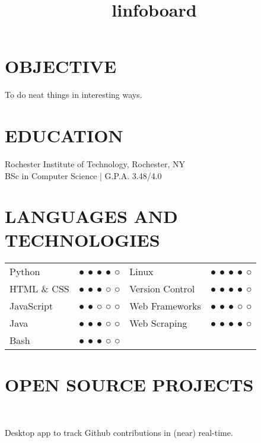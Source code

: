 \documentclass[line]{res}
\begin{document}

\address{131 Countess Drive\\West Henrietta, NY 14586}

\begin{resume}

\section{OBJECTIVE}
    To do neat things in interesting ways.

\section{EDUCATION}
    Rochester Institute of Technology, Rochester, NY \\
    BSc in Computer Science | G.P.A. 3.48/4.0

\section{LANGUAGES AND TECHNOLOGIES}
    \begin{tabular}{l c l c}
        Python      & ● ● ● ● ○ & Linux           & ● ● ● ● ○ \\
        HTML \& CSS & ● ● ● ○ ○ & Version Control & ● ● ● ● ○ \\
        JavaScript  & ● ● ○ ○ ○ & Web Frameworks  & ● ● ● ○ ○ \\
        Java        & ● ● ● ○ ○ & Web Scraping    & ● ● ● ● ○ \\
        Bash        & ● ● ● ○ ○ \\
    \end{tabular}

\section{OPEN SOURCE PROJECTS}
    \begin{format}
        \title{l}\\
        \body
    \end{format}

    \title{infoboard}
    \begin{position}
        Desktop app to track Github contributions in (near) real-time.
    \end{position}


\end{resume}
\end{document}
